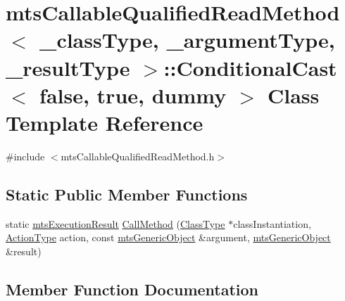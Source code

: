 \hypertarget{classmts_callable_qualified_read_method_1_1_conditional_cast_3_01false_00_01true_00_01dummy_01_4}{}\section{mts\+Callable\+Qualified\+Read\+Method$<$ \+\_\+class\+Type, \+\_\+argument\+Type, \+\_\+result\+Type $>$\+:\+:Conditional\+Cast$<$ false, true, dummy $>$ Class Template Reference}
\label{classmts_callable_qualified_read_method_1_1_conditional_cast_3_01false_00_01true_00_01dummy_01_4}


{\ttfamily \#include $<$mts\+Callable\+Qualified\+Read\+Method.\+h$>$}

\subsection*{Static Public Member Functions}
\begin{DoxyCompactItemize}
\item 
static \hyperlink{classmts_execution_result}{mts\+Execution\+Result} \hyperlink{classmts_callable_qualified_read_method_1_1_conditional_cast_3_01false_00_01true_00_01dummy_01_4_ae07239189a99998b02b7959194128ebe}{Call\+Method} (\hyperlink{classmts_callable_qualified_read_method_a6cfee5c3c3c49c691c2f5176ea79d735}{Class\+Type} $\ast$class\+Instantiation, \hyperlink{classmts_callable_qualified_read_method_a6327de6d1017295be394178d8e03b121}{Action\+Type} action, const \hyperlink{classmts_generic_object}{mts\+Generic\+Object} \&argument, \hyperlink{classmts_generic_object}{mts\+Generic\+Object} \&result)
\end{DoxyCompactItemize}


\subsection{Member Function Documentation}
\hypertarget{classmts_callable_qualified_read_method_1_1_conditional_cast_3_01false_00_01true_00_01dummy_01_4_ae07239189a99998b02b7959194128ebe}{}
